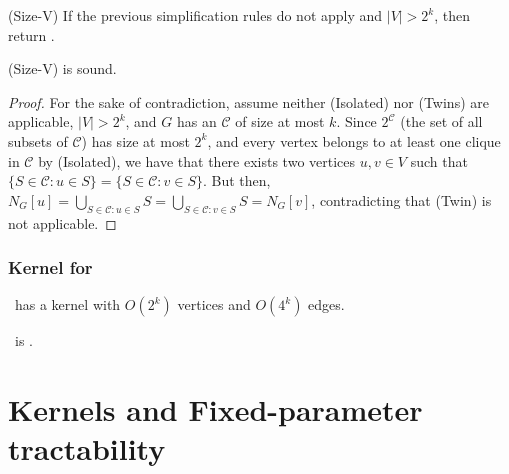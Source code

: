 \begin{frame}

	\begin{block}{(Size-V)}
		If the previous simplification rules do not apply and $|V|>2^k$, then return \No.
	\end{block}

	\begin{lemma}
		(Size-V) is sound.
	\end{lemma}
	\pause
	\begin{proof}
		For the sake of contradiction, assume neither (Isolated) nor (Twins) are applicable, $|V|>2^k$, and $G$ has
		an \ecc $\mathcal{C}$ of size at most $k$. Since $2^{\mathcal{C}}$ (the set of all subsets of $\mathcal{C}$) has
		size at most $2^k$, and every vertex belongs to at least one clique in $\mathcal{C}$ by (Isolated), we have that there exists two vertices $u,v\in V$ such that $\{S\in \mathcal{C} : u\in S\} = \{S\in \mathcal{C} : v\in S\}$. But then,
		$N_G[u]= \bigcup_{S\in \mathcal{C} : u\in S} S = \bigcup_{S\in \mathcal{C} : v\in S} S = N_G[v]$, contradicting that (Twin) is not applicable.
	\end{proof}

\end{frame}

\begin{frame}
	\frametitle{Kernel for \ECC}

	\begin{theorem}
		\ECC\ has a kernel with $O(2^k)$ vertices and $O(4^k)$ edges.
	\end{theorem}

	\begin{corollary}
		\ECC\ is \FPT.
	\end{corollary}

\end{frame}

\section{Kernels and Fixed-parameter tractability}

